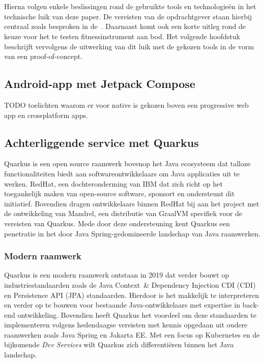 
\chapter{}
\label{ch:shortlist}
Hierna volgen enkele beslissingen rond de gebruikte tools en technologie\"en in het technische luik van deze paper.
De vereisten van de opdrachtgever staan hierbij centraal zoals besproken in de~.
Daarnaast komt ook een korte uitleg rond de keuze voor het te testen fitnessinstrument aan bod.
Het volgende hoofdstuk beschrijft vervolgens de uitwerking van dit luik met de gekozen tools in de vorm van een proof-of-concept.

\section{Android-app met Jetpack Compose}
\label{sec:keuze-framework-voor-android-app}
TODO toelichten waarom er voor native is gekozen boven een progressive web app en crossplatform apps. %

\section{Achterliggende service met Quarkus}
\label{sec:keuze-framework-voor-back-end}
Quarkus is een open source raamwerk bovenop het Java ecosysteem dat talloze functionaliteiten biedt aan softwareontwikkelaars om Java applicaties uit te werken.
RedHat, een dochteronderming van IBM dat zich richt op het toegankelijk maken van open-source software, sponsort en ondersteunt dit initiatief.
Bovendien dragen ontwikkelaars binnen RedHat bij aan het project met de ontwikkeling van Mandrel, een distributie van GraalVM specifiek voor de vereisten van Quarkus.
Mede door deze ondersteuning kent Quarkus een penetratie in het door Java Spring-gedomineerde landschap van Java raamwerken.

\subsection{Modern raamwerk}
\label{subsec:modern-raamwerk}
Quarkus is een modern raamwerk ontstaan in 2019 dat verder bouwt op industriestandaarden zoals de Java Context~\& Dependency Injection CDI (CDI) en Persistence API (JPA) standaarden.
Hierdoor is het makkelijk te interpreteren en verder op te bouwen voor bestaande Java-ontwikkelaars met expertise in back-end ontwikkeling.
Bovendien heeft Quarkus het voordeel om deze standaarden te implementeren volgens hedendaagse vereisten met kennis opgedaan uit oudere raamwerken zoals Java Spring en Jakarta EE\@.
Met een focus op Kubernetes en de bijkomende \textit{Dev Services} wilt Quarkus zich differentiëren binnen het Java landschap.

